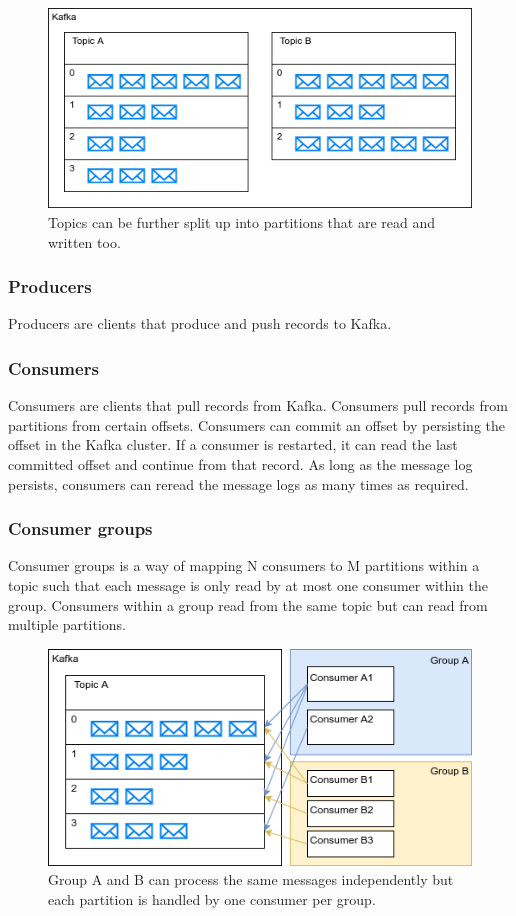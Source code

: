 \documentclass[11pt]{article}
\begin{document}
\begin{figure}[htbp]
\centerline{\includegraphics[scale=0.7]{assets/partitions.png}}
\caption{Topics can be further split up into partitions that are read and written too.}
\label{fig}
\end{figure}

\subsubsection{Producers}
Producers are clients that produce and push records to Kafka.

\subsubsection{Consumers}
Consumers are clients that pull records from Kafka. Consumers pull records from partitions from certain offsets. Consumers can commit an offset by persisting the offset in the Kafka cluster. If a consumer is restarted, it can read the last committed offset and continue from that record. As long as the message log persists, consumers can reread the message logs as many times as required.

\subsubsection{Consumer groups}
Consumer groups is a way of mapping N consumers to M partitions within a topic such that each message is only read by at most one consumer within the group. Consumers within a group read from the same topic but can read from multiple partitions.

\begin{figure}[htbp]
\centerline{\includegraphics[scale=0.7]{assets/cgroup.png}}
\caption{Group A and B can process the same messages independently but each partition is handled by one consumer per group.}
\label{fig}
\end{figure}
\end{document}
